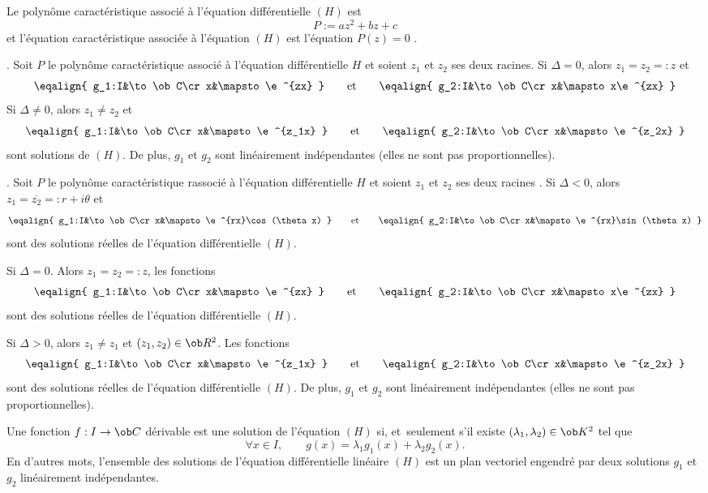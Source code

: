 \Definition []  Le polynôme caractéristique associé à l'équation différentielle $(H)$ est 
$$
P:=az^2+bz+c
$$
et l'équation caractéristique  associée à l'équation $(H)$ est l'équation  $P(z)=0$ . 
\bigskip

. Soit $P$ le polynôme caractéristique associé à l'équation dif\-fé\-ren\-tiel\-le $H$ et soient $z_1$ et $z_2$ ses deux racines. 
\medskip
\noindent
Si $\Delta=0$, alors $z_1=z_2=:z$ et 
$$
\eqalign{
	g_1:I&\to\ob C\cr
	x&\mapsto\e^{zx}
}
\qquad\mbox{et}\qquad 
\eqalign{
	g_2:I&\to\ob C\cr
	x&\mapsto x\e^{zx}
	}
$$ 
Si $\Delta\neq0$, alors $z_1\neq z_2$ et 
$$
\eqalign{
	g_1:I&\to\ob C\cr
	x&\mapsto\e^{z_1x}
}
\qquad\mbox{et}\qquad 
\eqalign{
	g_2:I&\to\ob C\cr
	x&\mapsto\e^{z_2x}
	}
$$ 
 sont solutions de $(H)$.
\medskip\noindent
De plus, $g_1$ et $g_2$ sont linéairement indépendantes (elles ne sont pas proportionnelles). 
\bigskip


. 
Soit $P$ le polynôme caractéristique rassocié à l'équation  dif\-fé\-ren\-tiel\-le   $H$   et  
soient  $z_1$  et  $z_2$  ses  deux  racines .  \medskip  \noindent Si  $\Delta<0$,  alors
$z_1=\overline{z_2}=:r+i\theta$            
                                                                                et
$$
\eqalign{
	g_1:I&\to\ob C\cr
	x&\mapsto\e^{rx}\cos(\theta x)
}
\qquad\mbox{et}\qquad 
\eqalign{
	g_2:I&\to\ob C\cr
	x&\mapsto\e^{rx}\sin(\theta x)
	}
$$ 
sont des solutions réelles de l'équation différentielle $(H)$.  \medskip

\noindent Si $\Delta=0$. Alors $z_1=z_2=:z$, les fonctions
$$
\eqalign{
	g_1:I&\to\ob C\cr
	x&\mapsto\e^{zx}
}\qquad\mbox{et}\qquad 
\eqalign{
	g_2:I&\to\ob C\cr
	x&\mapsto x\e^{zx}
	}
$$   sont des solutions réelles de l'équation différentielle $(H)$. 
\medskip

\noindent
Si $\Delta>0$, alors $z_1 \neq z_1$ et $(z_1,z_2)\in\ob R^2$. Les fonctions 
$$
\eqalign{
	g_1:I&\to\ob C\cr
	x&\mapsto\e^{z_1x}
}
\qquad\mbox{et}\qquad 
\eqalign{
	g_2:I&\to\ob C\cr
	x&\mapsto\e^{z_2x}
	}
$$ 
 sont des solutions réelles de l'équation différentielle $(H)$. 
\medskip\noindent
De plus, $g_1$ et $g_2$ sont linéairement indépendantes (elles ne sont pas proportionnelles). 
\bigskip


\Theoreme  Une fonction $f:I\to\ob C$ dérivable est une solution de l'équation $(H)$ si, et~seulement s'il existe $(\lambda_1,\lambda_2)\in\ob K^2$ tel que 
$$
\forall x\in I ,\qquad  g(x)=\lambda_1g_1(x)+\lambda_2g_2(x) .
$$
En d'autres mots, l'ensemble des solutions de l'équation différentielle linéaire $(H)$ est un plan vectoriel 
engendré par deux solutions $g_1$ et $g_2$ linéairement indépendantes. 
\bigskip


